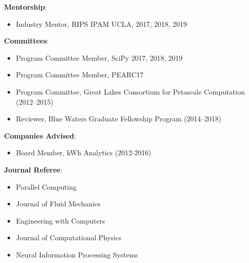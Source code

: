 
\textbf{Mentorship}:
\begin{itemize}
\itemsep 0pt
 \item Industry Mentor, RIPS IPAM UCLA, 2017, 2018, 2019
\end{itemize}

\blankline


\textbf{Committees}:
\begin{itemize}
\itemsep 0pt
 \item Program Committee Member, SciPy 2017, 2018, 2019
 \item Program Committee Member, PEARC17
 \item Program Committee, Great Lakes Consortium for Petascale Computation (2012--2015)
 \item Reviewer, Blue Waters Graduate Fellowship Program (2014--2018)
\end{itemize}
\blankline


\textbf{Companies Advised}:
\begin{itemize}
\itemsep 0pt
 \item Board Member, kWh Analytics (2012-2016)
\end{itemize}

\blankline

\textbf{Journal Referee}:
\begin{itemize}
\itemsep 0pt
 \item Parallel Computing
 \item Journal of Fluid Mechanics
 \item Engineering with Computers
 \item Journal of Computational Physics
 \item Neural Information Processing Systems
\end{itemize}
